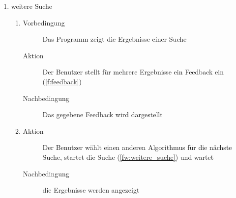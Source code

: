 \begin{enumerate} [label=\bfseries /TSW \arabic*0/, leftmargin=*]
\item weitere Suche \label{ts:weitere_suche}
	\begin{enumerate}[leftmargin=0pt]
		\item
		\begin{description}
			\item[Vorbedingung] Das Programm zeigt die Ergebnisse einer Suche
			\item[Aktion] Der Benutzer stellt für mehrere Ergebnisse ein Feedback ein (\ref{f:feedback})
			\item[Nachbedingung] Das gegebene Feedback wird dargestellt
		\end{description}
		\item
		\begin{description}
			\item[Aktion] Der Benutzer wählt einen anderen Algorithmus für die nächste Suche, startet die Suche (\ref{fw:weitere_suche}) und wartet
			\item[Nachbedingung] die Ergebnisse werden angezeigt
		\end{description}
	\end{enumerate}


\end{enumerate}
